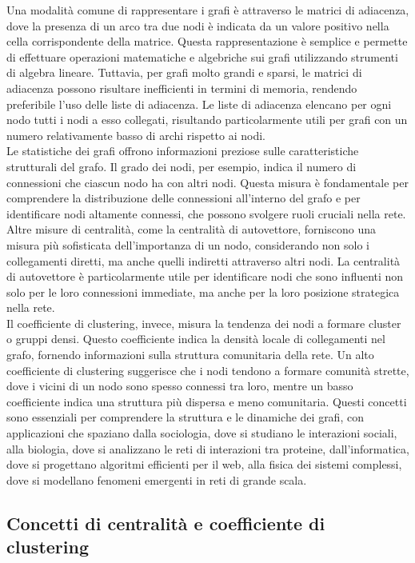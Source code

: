 \documentclass{article}
\begin{document}
Una modalità comune di rappresentare i grafi è attraverso le matrici di adiacenza, dove la presenza di un arco tra due nodi è indicata da un valore positivo nella cella corrispondente della matrice. Questa rappresentazione è semplice e permette di effettuare operazioni matematiche e algebriche sui grafi utilizzando strumenti di algebra lineare. Tuttavia, per grafi molto grandi e sparsi, le matrici di adiacenza possono risultare inefficienti in termini di memoria, rendendo preferibile l'uso delle liste di adiacenza. Le liste di adiacenza elencano per ogni nodo tutti i nodi a esso collegati, risultando particolarmente utili per grafi con un numero relativamente basso di archi rispetto ai nodi.\\
Le statistiche dei grafi offrono informazioni preziose sulle caratteristiche strutturali del grafo. Il grado dei nodi, per esempio, indica il numero di connessioni che ciascun nodo ha con altri nodi. Questa misura è fondamentale per comprendere la distribuzione delle connessioni all'interno del grafo e per identificare nodi altamente connessi, che possono svolgere ruoli cruciali nella rete. Altre misure di centralità, come la centralità di autovettore, forniscono una misura più sofisticata dell'importanza di un nodo, considerando non solo i collegamenti diretti, ma anche quelli indiretti attraverso altri nodi. La centralità di autovettore è particolarmente utile per identificare nodi che sono influenti non solo per le loro connessioni immediate, ma anche per la loro posizione strategica nella rete.\\
Il coefficiente di clustering, invece, misura la tendenza dei nodi a formare cluster o gruppi densi. Questo coefficiente indica la densità locale di collegamenti nel grafo, fornendo informazioni sulla struttura comunitaria della rete. Un alto coefficiente di clustering suggerisce che i nodi tendono a formare comunità strette, dove i vicini di un nodo sono spesso connessi tra loro, mentre un basso coefficiente indica una struttura più dispersa e meno comunitaria. Questi concetti sono essenziali per comprendere la struttura e le dinamiche dei grafi, con applicazioni che spaziano dalla sociologia, dove si studiano le interazioni sociali, alla biologia, dove si analizzano le reti di interazioni tra proteine, dall'informatica, dove si progettano algoritmi efficienti per il web, alla fisica dei sistemi complessi, dove si modellano fenomeni emergenti in reti di grande scala.

\subsection{Concetti di centralità e coefficiente di clustering}
\end{document}
